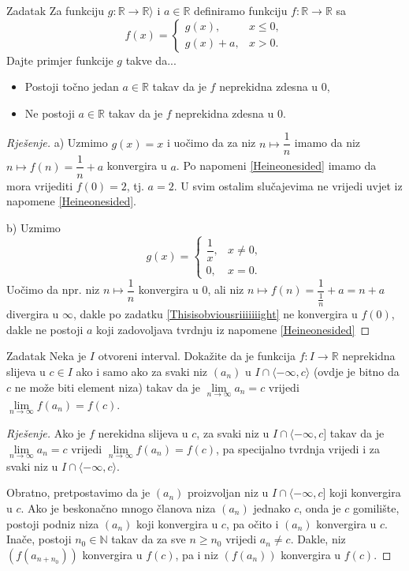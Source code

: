 \begin{exercise}{Zadatak}
Za funkciju $g : \mathbb{R}\to \mathbb{R}\rangle$ i $a\in \mathbb{R}$ definiramo funkciju $f : \mathbb{R}\to \mathbb{R}$ sa
$$f(x)=\begin{cases}
g(x),& x\leq 0,\\
g(x)+a, & x>0.
\end{cases}$$
Dajte primjer funkcije $g$ takve da...
\begin{itemize}
\item[a)] Postoji točno jedan $a\in \mathbb{R}$ takav da je $f$ neprekidna zdesna u $0$,
\item[b)] Ne postoji $a\in \mathbb{R}$ takav da je $f$ neprekidna zdesna u $0$. 
\end{itemize}
\end{exercise}
\begin{proof}[Rješenje]

a) Uzmimo $g(x)=x$ i uočimo da za niz $n\mapsto \dfrac{1}{n}$ imamo da niz $n\mapsto f(n)=\dfrac{1}{n}+a$ konvergira u $a$. Po napomeni \ref{Heineonesided} imamo da mora vrijediti $f(0)=2$, tj. $a=2$. U svim ostalim slučajevima ne vrijedi uvjet iz napomene \ref{Heineonesided}.

b) Uzmimo
$$g(x)=\begin{cases}
\dfrac{1}{x},& x\neq 0,\\
0, & x=0.
\end{cases}$$
Uočimo da npr. niz $n\mapsto \dfrac{1}{n}$ konvergira u $0$, ali niz $n\mapsto f(n)=\dfrac{1}{\frac{1}{n}}+a=n+a$ divergira u $\infty$, dakle po zadatku \ref{Thisisobviousriiiiiiight} ne konvergira u $f(0)$, dakle ne postoji $a$ koji zadovoljava tvrdnju iz napomene \ref{Heineonesided}
\end{proof}
\begin{exercise}{Zadatak}
\label{Heinemodification}
Neka je $I$ otvoreni interval. Dokažite da je funkcija $f : I\to \mathbb{R}$ neprekidna slijeva u $c\in I$ ako i samo ako za svaki niz $(a_n)$ u $I\cap \langle -\infty, c\rangle$ (ovdje je bitno da $c$ ne može biti element niza) takav da je $\lim\limits_{n\to \infty}{a_n}=c$ vrijedi $\lim\limits_{n\to\infty}{f(a_n)}=f(c)$.
\end{exercise}
\begin{proof}[Rješenje]
Ako je $f$ nerekidna slijeva u $c$, za svaki niz u $I\cap \langle -\infty, c]$  takav da je $\lim\limits_{n\to \infty}{a_n}=c$ vrijedi $\lim\limits_{n\to\infty}{f(a_n)}=f(c)$, pa specijalno tvrdnja vrijedi i za svaki niz u $I\cap \langle -\infty, c\rangle$.

Obratno, pretpostavimo da je $(a_n)$ proizvoljan niz u $I\cap \langle -\infty, c]$ koji konvergira u $c$. Ako je beskonačno mnogo članova niza $(a_n)$ jednako $c$, onda je $c$ gomilište, postoji podniz niza $(a_n)$ koji konvergira u $c$, pa očito i $(a_n)$ konvergira u $c$. Inače, postoji $n_0\in \mathbb{N}$ takav da za sve $n\geq n_0$ vrijedi $a_n\neq c$. Dakle, niz $(f\left(a_{n+n_0}\right))$ konvergira u $f(c)$, pa i niz $\left( f(a_n)\right)$ konvergira u $f(c)$.
\end{proof}
